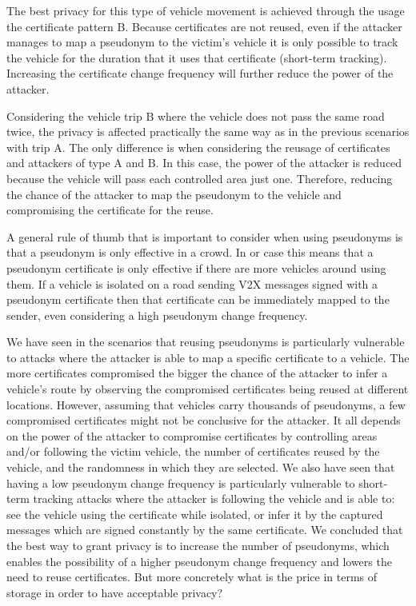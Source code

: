 The best privacy for this type of vehicle movement is achieved through the usage the certificate pattern B. Because certificates are not reused, even if the attacker manages to map a pseudonym to the victim's vehicle it is only possible to track the vehicle for the duration that it uses that certificate (short-term tracking). Increasing the certificate change frequency will further reduce the power of the attacker. 


Considering the vehicle trip B where the vehicle does not pass the same road twice, the privacy is affected practically the same way as in the previous scenarios with trip A. The only difference is when considering the reusage of certificates and attackers of type A and B. In this case, the power of the attacker is reduced because the vehicle will pass each controlled area just one. Therefore, reducing the chance of the attacker to map the pseudonym to the vehicle and compromising the certificate for the reuse. 

A general rule of thumb that is important to consider when using pseudonyms is that a pseudonym is only effective in a crowd. In or case this means that a pseudonym certificate is only effective if there are more vehicles around using them. If a vehicle is isolated on a road sending V2X messages signed with a pseudonym certificate then that certificate can be immediately mapped to the sender, even considering a high pseudonym change frequency.

We have seen in the scenarios that reusing pseudonyms is particularly vulnerable to attacks where the attacker is able to map a specific certificate to a vehicle. The more certificates compromised the bigger the chance of the attacker to infer a vehicle's route by observing the compromised certificates being reused at different locations. However, assuming that vehicles carry thousands of pseudonyms, a few compromised certificates might not be conclusive for the attacker. It all depends on the power of the attacker to compromise certificates by controlling areas and/or following the victim vehicle, the number of certificates reused by the vehicle, and the randomness in which they are selected. We also have seen that having a low pseudonym change frequency is particularly vulnerable to short-term tracking attacks where the attacker is following the vehicle and is able to: see the vehicle using the certificate while isolated, or infer it by the captured messages which are signed constantly by the same certificate. We concluded that the best way to grant privacy is to increase the number of pseudonyms, which enables the possibility of a higher pseudonym change frequency and lowers the need to reuse certificates. But more concretely what is the price in terms of storage in order to have acceptable privacy? 

